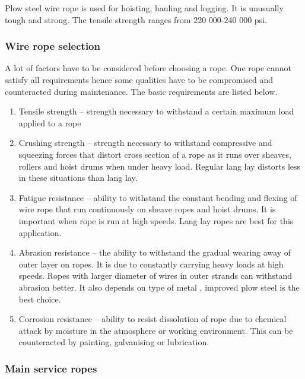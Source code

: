 \noindent Plow steel wire rope is used for hoisting, hauling and logging. It is unusually tough and strong. The tensile strength ranges from 220 000-240 000 psi.\par


\subsubsection{ Wire rope selection}

\noindent A lot of factors have to be considered before choosing a rope. One rope cannot satisfy all requirements hence some qualities have to be compromised and counteracted during maintenance. The basic requirements are listed below.\par

\begin{enumerate}
\item  Tensile strength -- strength necessary to withstand a certain maximum load applied to a rope

\item  Crushing strength -- strength necessary to withstand compressive and squeezing forces that distort cross section of a rope as it runs over sheaves, rollers and hoist drums when under heavy load. Regular lang lay distorts less in these situations than lang lay.

\item  Fatigue resistance -- ability to withstand the constant bending and flexing of wire rope that run continuously on sheave ropes and hoist drums. It is important when rope is run at high speeds. Lang lay ropes are best for this application.

\item  Abrasion resistance -- the ability to withstand the gradual wearing away of outer layer on ropes. It is due to constantly carrying heavy loads at high speeds. Ropes with larger diameter of wires in outer strands can withstand abrasion better. It also depends on type of metal , improved plow steel is the best choice.

\item  Corrosion resistance -- ability to resist dissolution of rope due to chemical attack by moisture in the atmosphere or working environment. This can be counteracted by painting, galvanising or lubrication.
\end{enumerate}


\subsubsection{ Main service ropes}

